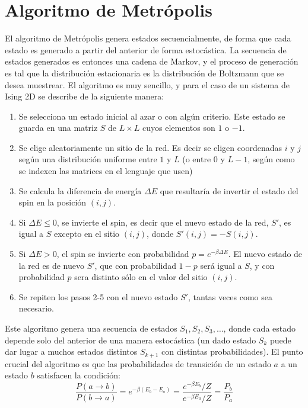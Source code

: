 \documentclass[a4paper,11pt,oneside]{article}
\begin{document}
\section{Algoritmo de Metrópolis}
\label{sec:metro}

El algoritmo de Metrópolis genera estados secuencialmente, de forma que cada
estado es generado a partir del anterior de forma estocástica. La secuencia de
estados generados es entonces una cadena de Markov, y el proceso de generación
es tal que la distribución estacionaria es la distribución de Boltzmann que se
desea muestrear. El algoritmo es muy sencillo, y para el caso de un sistema de
Ising 2D se describe de la siguiente manera:
\begin{enumerate}
\item Se selecciona un estado inicial al azar o con algún criterio. Este estado
    se guarda en una matriz $S$ de $L\times L$ cuyos elementos son $1$ o $-1$.
\item Se elige aleatoriamente un sitio de la red. Es decir se eligen
    coordenadas $i$ y $j$ según una distribución uniforme entre $1$ y $L$ (o
    entre $0$ y $L-1$, según como se indexen las matrices en el lenguaje que
    usen)
\item Se calcula la diferencia de energía $\Delta E$ que resultaría de invertir
    el estado del spin en la posición $(i,j)$.
\item Si $\Delta E \leq 0$, se invierte el spin, es decir que el nuevo estado
    de la red, $S'$, es igual a $S$ excepto en el sitio $(i,j)$,
    donde $S'(i,j) = -S(i,j)$.
\item Si $\Delta E >0$, el spin se invierte con probabilidad $p = e^{-\beta\Delta
    E}$. El nuevo estado de la red es de nuevo $S'$, que con probabilidad
    $1-p$ será igual a $S$, y con probabilidad $p$ sera distinto sólo en el
    valor del sitio $(i,j)$.
\item Se repiten los pasos 2-5 con el nuevo estado $S'$, tantas veces como sea
    necesario.
\end{enumerate}
Este algoritmo genera una secuencia de estados $S_1,S_2,S_3,\dots$, donde cada
estado depende solo del anterior de una manera estocástica (un dado estado
$S_k$ puede dar lugar a muchos estados distintos $S_{k+1}$ con distintas probabilidades).
El punto crucial del algoritmo es que las probabilidades de transición de un
estado $a$ a un estado $b$ satisfacen la condición:
\begin{equation}
    \frac{P(a\to b)}{P(b\to a)} = e^{-\beta(E_b-E_a)} = \frac{e^{-\beta
    E_b}/Z}{e^{-\beta E_a}/Z} = \frac{P_b}{P_a}
    \label{eq:bal_detallado}
\end{equation}
\end{document}
